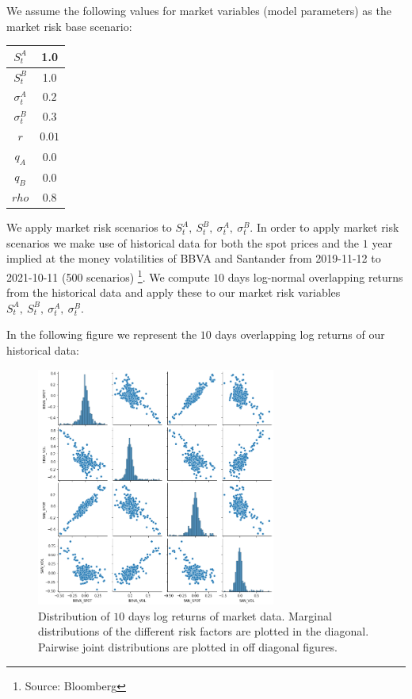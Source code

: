 We assume the following values for market variables (model parameters) as the market risk base scenario:

\begin{center}
\begin{tabular}{||c | c||} 
 \hline
 $S_t^A$ & 1.0 \\
 \hline
 $S_t^B$ & 1.0 \\
 \hline
 $\sigma_t^A$ & $0.2$ \\
 \hline
 $\sigma_t^B$ & $0.3$ \\
 \hline
 $r$ & $0.01$ \\
 \hline
 $q_A$ & $0.0$ \\
 \hline
 $q_B$ & $0.0$ \\
 \hline
 $rho$ & $0.8$ \\
 \hline
\end{tabular}
\end{center}

We apply market risk scenarios to $S_t^A,\ S_t^B,\ \sigma_t^A,\ \sigma_t^B$.
In order to apply market risk scenarios we make use of historical data for both the spot prices and the $1$ year implied at the money volatilities of BBVA and Santander from 2019-11-12 to 2021-10-11 (500 scenarios) \footnote{Source: Bloomberg}. We compute $10$ days log-normal overlapping returns from the historical data and apply these to our market risk variables $S_t^A,\ S_t^B,\ \sigma_t^A,\ \sigma_t^B$.


In the following figure we represent the $10$ days overlapping log returns of our historical data:

\begin{figure}[h] 
\centering
\includegraphics[width=0.7\textwidth]{Figures/MarketRisk/histdata.png}
\caption{Distribution of $10$ days log returns of market data. Marginal distributions of the different risk factors are plotted in the diagonal. Pairwise joint distributions are plotted in off diagonal figures.}
\label{fig:distrib_P}
\end{figure}

